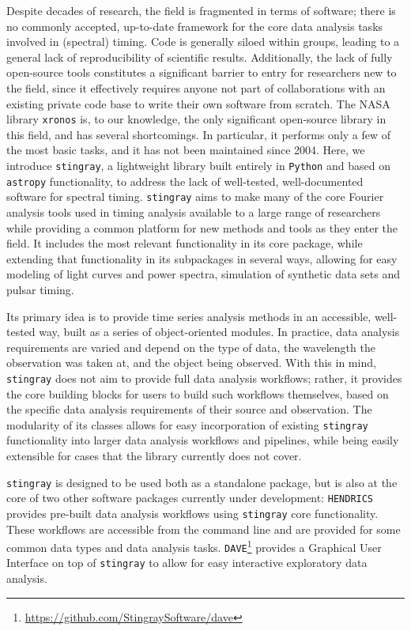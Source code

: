 \documentclass[12pt]{emulateapj}
\newcommand{\stingray}{\texttt{stingray}\xspace}
\newcommand{\python}{\texttt{Python}\xspace}
\newcommand{\astropy}{\texttt{astropy}\xspace}
\newcommand{\hendrics}{\texttt{HENDRICS}\xspace}
\newcommand{\dave}{\texttt{DAVE}\xspace}
\begin{document}
Despite decades of research, the field is fragmented in terms of software; there is no commonly accepted, up-to-date framework for the core data analysis tasks involved in (spectral) timing. Code is generally siloed within groups, leading to a general lack of reproducibility of scientific results. Additionally, the lack of fully open-source tools constitutes a significant barrier to entry for researchers new to the field, since it effectively requires anyone not part of collaborations with an existing private code base to write their own software from scratch. 
The NASA library \texttt{xronos} is, to our knowledge, the only significant open-source library in this field, and has several shortcomings. 
In particular, it performs only a few of the most basic tasks, and it has not been maintained since 2004. 
Here, we introduce \stingray, a lightweight library built entirely in \python and based on \astropy functionality, to address the lack of well-tested, well-documented software for spectral timing. 
\stingray aims to make many of the core Fourier analysis tools used in timing analysis available to a large range of researchers while providing a common platform for new methods and tools as they enter the field. 
It includes the most relevant functionality in its core package, while extending that functionality in its subpackages in several ways, allowing for easy modeling of light curves and power spectra, simulation of synthetic data sets and pulsar timing. 

Its primary idea is to provide time series analysis methods in an accessible, well-tested way, built as a series of object-oriented modules. In practice, data 
analysis requirements are varied and depend on the type of data, the wavelength the observation was taken at, and the object being observed. With this in mind, 
\stingray does not aim to provide full data analysis workflows; rather, it provides the core building blocks for users to build such workflows themselves, based on the specific data analysis requirements of their source and observation. 
The modularity of its classes allows for easy incorporation of existing \stingray functionality into larger data analysis workflows and pipelines, while being easily extensible for cases that the library currently does not cover. 

\stingray is designed to be used both as a standalone package, but is also at the core of two other software packages currently under development: \hendrics \citep{hendrics} provides pre-built data analysis workflows using \stingray core functionality. These workflows are accessible from the command line and are provided for some common data types and data analysis tasks. \dave\footnote{\url{https://github.com/StingraySoftware/dave}} provides a Graphical User Interface on top of \stingray to allow for easy interactive exploratory data analysis.
 
\end{document}
